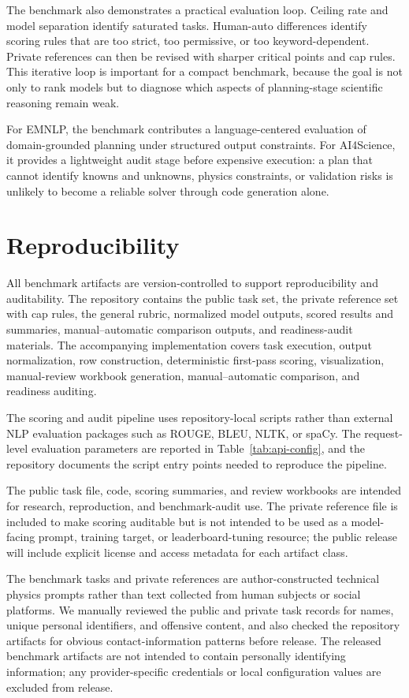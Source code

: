 \documentclass[11pt]{article}
\begin{document}
The benchmark also demonstrates a practical evaluation loop. Ceiling rate and model separation identify saturated tasks. Human-auto differences identify scoring rules that are too strict, too permissive, or too keyword-dependent. Private references can then be revised with sharper critical points and cap rules. This iterative loop is important for a compact benchmark, because the goal is not only to rank models but to diagnose which aspects of planning-stage scientific reasoning remain weak.

For EMNLP, the benchmark contributes a language-centered evaluation of domain-grounded planning under structured output constraints. For AI4Science, it provides a lightweight audit stage before expensive execution: a plan that cannot identify knowns and unknowns, physics constraints, or validation risks is unlikely to become a reliable solver through code generation alone.

\section{Reproducibility}

All benchmark artifacts are version-controlled to support reproducibility and auditability. The repository contains the public task set, the private reference set with cap rules, the general rubric, normalized model outputs, scored results and summaries, manual--automatic comparison outputs, and readiness-audit materials. The accompanying implementation covers task execution, output normalization, row construction, deterministic first-pass scoring, visualization, manual-review workbook generation, manual--automatic comparison, and readiness auditing.

The scoring and audit pipeline uses repository-local scripts rather than external NLP evaluation packages such as ROUGE, BLEU, NLTK, or spaCy. The request-level evaluation parameters are reported in Table~\ref{tab:api-config}, and the repository documents the script entry points needed to reproduce the pipeline.

The public task file, code, scoring summaries, and review workbooks are intended for research, reproduction, and benchmark-audit use. The private reference file is included to make scoring auditable but is not intended to be used as a model-facing prompt, training target, or leaderboard-tuning resource; the public release will include explicit license and access metadata for each artifact class.

The benchmark tasks and private references are author-constructed technical physics prompts rather than text collected from human subjects or social platforms. We manually reviewed the public and private task records for names, unique personal identifiers, and offensive content, and also checked the repository artifacts for obvious contact-information patterns before release. The released benchmark artifacts are not intended to contain personally identifying information; any provider-specific credentials or local configuration values are excluded from release.
\end{document}
